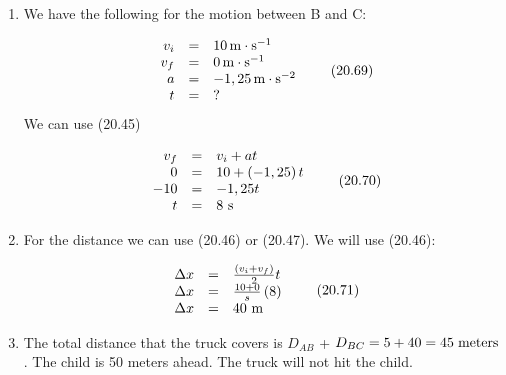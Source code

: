 {\begin{mdframed}[linewidth=4, leftmargin=40, rightmargin=40]
\begin{exercise}
\begin{enumerate}[noitemsep, label=\textbf{Step} \textbf{\arabic*}. ]
\begin{equation}
      \end{equation}
      \label{m38796*id80103}The truck covers 5 m before the driver hits the brakes.\par 
      \item  
      \label{m38796*id80115}We have the following for the motion between B and C:\par 
      \label{m38796*id80119}\nopagebreak\noindent{}
        
    \begin{equation}
    \begin{array}{ccc}\hfill {v}_{i}& =& 10\phantom{\rule{0.166667em}{0ex}}\mathrm{m}\ensuremath{\cdot}{\mathrm{s}}^{-1}\hfill \\ \hfill {v}_{f}& =& 0\phantom{\rule{0.166667em}{0ex}}\mathrm{m}\ensuremath{\cdot}{\mathrm{s}}^{-1}\hfill \\ \hfill a& =& -1,25\phantom{\rule{0.166667em}{0ex}}\mathrm{m}\ensuremath{\cdot}{\mathrm{s}}^{-2}\hfill \\ \hfill t& =& ?\hfill \end{array}\tag{20.69}
      \end{equation}
      \label{m38796*id80281}We can use (20.45)\par 
      \label{m38796*id80290}\nopagebreak\noindent{}
        
    \begin{equation}
    \begin{array}{ccc}\hfill {v}_{f}& =& {v}_{i}+at\hfill \\ \hfill 0& =& 10+\left(-1,25\right)t\hfill \\ \hfill -10& =& -1,25t\hfill \\ \hfill t& =& 8\phantom{\rule{3.33333pt}{0ex}}\mathrm{s}\hfill \end{array}\tag{20.70}
      \end{equation}
      \item  
      \label{m38796*id80425}For the distance we can use (20.46) or (20.47). We will use (20.46):\par 
      \label{m38796*id80435}\nopagebreak\noindent{}
        
    \begin{equation}
    \begin{array}{ccc}\hfill \Delta x& =& \frac{\left({v}_{i}+{v}_{f}\right)}{2}t\hfill \\ \hfill \Delta x& =& \frac{10+0}{s}\left(8\right)\hfill \\ \hfill \Delta x& =& 40\phantom{\rule{3.33333pt}{0ex}}\mathrm{m}\hfill \end{array}\tag{20.71}
      \end{equation}
      \item  
      \label{m38796*id80562}The total distance that the truck covers is ${D}_{AB}$ + ${D}_{BC}=5+40=45\phantom{\rule{3pt}{0ex}}\mathrm{meters}$.
The child is 50 meters ahead. The truck will not hit the child.
 \par 
      \end{enumerate}
    \end{exercise}
    \end{mdframed}
    }
